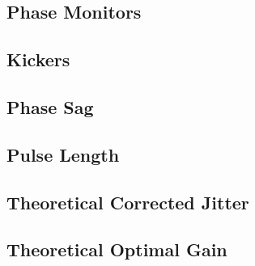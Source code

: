 \subsection{Phase Monitors}
\label{ss:phMons}

\subsection{Kickers}
\label{ss:kickers}


\subsection{Phase Sag}
\label{ss:phaseSag}

\subsection{Pulse Length}
\label{ss:pulseLength}


\subsection{Theoretical Corrected Jitter}
\label{ss:theoryJitter}

\subsection{Theoretical Optimal Gain}
\label{ss:theoryGain}


